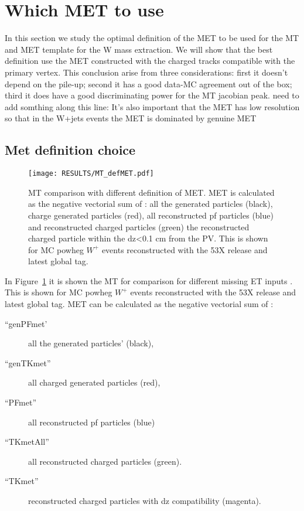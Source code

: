 \section{Which MET to use}
\label{sec:METDEF}
In this section we study the optimal definition of the MET to be used for the MT and MET template for the W mass extraction.
We will show that the best definition use the MET constructed with the charged tracks compatible with the primary vertex.
This conclusion arise from three considerations: first it doesn't depend on the pile-up; second it has a good data-MC agreement out of the box; third it does have a good discriminating power for the MT jacobian peak.
{\color{magenta} {need to add somthing along this line: It's also important that the MET has low resolution so that in the W+jets events the MET is dominated by genuine MET}}

\subsection{Met definition choice}
\begin{figure}[h!]
  \begin{center}
    \texttt{[image: RESULTS/MT\_defMET.pdf]}
    \caption{MT comparison with different definition of MET. MET is calculated as the negative vectorial sum of : all the generated particles (black), charge generated  particles (red), all reconstructed pf particles (blue) and reconstructed charged particles (green) the reconstructed charged particle within the dz<0.1 cm from the PV. This is shown for MC powheg $W^{+}$ events reconstructed with the 53X release and latest global tag.}
    \label{fig:PFMETvsTKMET}
  \end{center}
\end{figure}

In Figure~\ref{fig:PFMETvsTKMET} it is shown the MT for comparison for different missing ET inputs .
This is shown for MC powheg $W^{+}$ events reconstructed with the 53X release and latest global tag.
MET can be calculated as the negative vectorial sum of : 
\begin{description} 
\item[``genPFmet'] all the generated particles' (black), 
\item[``genTKmet''] all charged generated  particles  (red), 
\item[``PFmet''] all reconstructed pf particles   (blue) 
\item[``TKmetAll''] all reconstructed charged particles (green).
\item[``TKmet''] reconstructed charged particles with dz compatibility (magenta).
\end{description}

